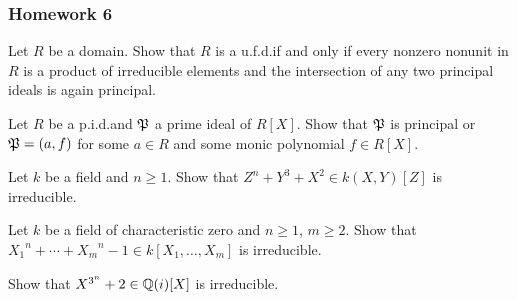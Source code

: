 \subsubsection{Homework 6}
\setcounter{exercise}{0}
\setcounter{equation}{0}

\begin{problem}
  Let $R$ be a domain. Show that $R$ is a u.f.d.\@ if and only if every
  nonzero nonunit in $R$ is a product of irreducible elements and the
  intersection of any two principal ideals is again principal.
\end{problem}
\begin{solution}
\end{solution}

\begin{problem}
  Let $R$ be a p.i.d.\@ and $\mathfrak{P}$ a prime ideal of $R[X]$. Show that
  $\mathfrak{P}$ is principal or $\mathfrak{P}=(a,f)$ for some $a\in R$ and some monic
  polynomial $f\in R[X]$.
\end{problem}
\begin{solution}
\end{solution}

\begin{problem}
  Let $k$ be a field and $n\geq 1$. Show that $Z^n+Y^3+X^2\in k(X,Y)[Z]$ is
  irreducible.
\end{problem}
\begin{solution}
\end{solution}

\begin{problem}
  Let $k$ be a field of characteristic zero and $n\geq 1$, $m\geq 2$. Show
  that ${X_1}^n+\dotsb+{X_m}^n-1\in k[X_1,\dotsc,X_m]$ is irreducible.
\end{problem}
\begin{solution}
\end{solution}

\begin{problem}
  Show that $X^{3^n}+2\in\mathbb{Q}(i)[X]$ is irreducible.
\end{problem}
\begin{solution}
\end{solution}

